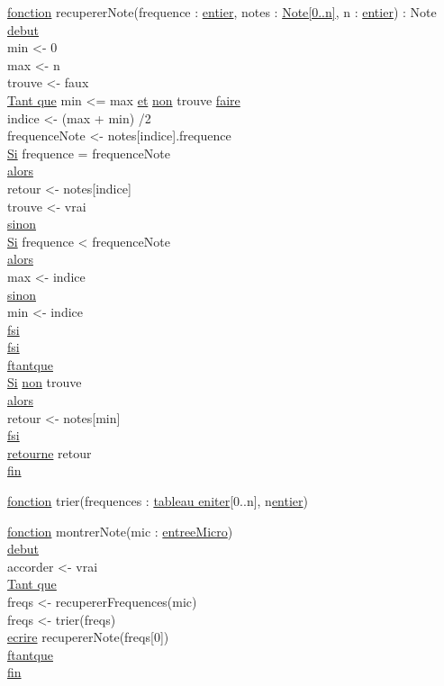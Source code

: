\documentclass{article}
\begin{document}
\begin{tabbing}
\ul{fonction} recupererNote(frequence : \ul{entier}, notes : \ul{Note[0..n]}, n : \ul{entier}) : Note\\
\ul{debut}\\
min <- 0\\
max <- n\\
trouve <- faux\\
\ul{Tant que} min <= max \ul{et} \ul{non} trouve \ul{faire}\\
    indice <- (max + min) /2 \\
    frequenceNote <- notes[indice].frequence\\
    \ul{Si} frequence = frequenceNote\\
    \ul{alors}\\
        retour <- notes[indice]\\
        trouve <- vrai\\
    \ul{sinon}\\
        \ul{Si} frequence < frequenceNote\\
        \ul{alors}\\
            max <- indice\\
        \ul{sinon}\\
            min <- indice\\
        \ul{fsi}\\
    \ul{fsi}\\
\ul{ftantque}\\
\ul{Si} \ul{non} trouve\\
\ul{alors}\\
    retour <- notes[min]\\
\ul{fsi}\\
\ul{retourne} retour\\
\ul{fin}\\
\end{tabbing}


\begin{tabbing}
\ul{fonction} trier(frequences : \ul{tableau eniter}[0..n], n\ul{entier})
\end{tabbing}


\begin{tabbing}
\ul{fonction} montrerNote(mic : \ul{entreeMicro})\\
\ul{debut}\\
accorder <- vrai\\
\ul{Tant que}\\
freqs <- recupererFrequences(mic)\\
freqs <- trier(freqs)\\
\ul{ecrire} recupererNote(freqs[0])\\
\ul{ftantque}\\
\ul{fin}\\
\end{tabbing}
\end{document}
